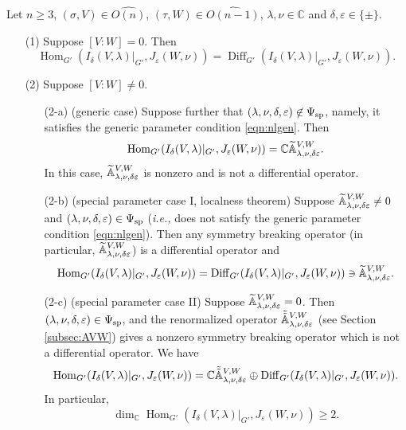 \begin{theorem}
\label{thm:VWSBO}
Let $n \ge 3$, 
 $(\sigma, V) \in \widehat{O(n)}$, 
 $(\tau,W) \in \widehat{O(n-1)}$, 
 $\lambda, \nu \in {\mathbb{C}}$
 and $\delta, \varepsilon \in \{\pm\}$.  
\begin{enumerate}
\item[{\rm{(1)}}]
Suppose 
$[V:W] =0$.  
Then 
\[
  {\operatorname{Hom}}_{G'}(I_{\delta}(V,\lambda)|_{G'}, J_{\varepsilon}(W,\nu))  =
{\operatorname{Diff}}_{G'}(I_{\delta}(V,\lambda)|_{G'}, J_{\varepsilon}(W,\nu)).  
\]
\item[{\rm{(2)}}]
Suppose $[V:W]  \ne 0$.  
\begin{enumerate}
\item[{\rm{(2-a)}}]
{\rm{(generic case)}}\enspace
Suppose further 
 that $(\lambda, \nu, \delta, \varepsilon) \not\in \Psi_{{\operatorname{sp}}}$, 
 namely,
 it satisfies
 the generic parameter condition \eqref{eqn:nlgen}.  
Then 
\[
  {\operatorname{Hom}}_{G'}(I_{\delta}(V,\lambda)|_{G'}, J_{\varepsilon}(W,\nu))  =
{\mathbb{C}} {\widetilde{\mathbb{A}}}_{{\lambda},{\nu},{\delta\varepsilon}}^{{V,W}}.  
\]
In this case, 
 ${\widetilde{\mathbb{A}}}_{{\lambda},{\nu},{\delta\varepsilon}}^{{V,W}}$ is nonzero 
 and is not a differential operator.  
\item[{\rm{(2-b)}}]
{\rm{(special parameter case I, localness theorem)}}\enspace
{}
Suppose ${\widetilde{\mathbb{A}}}_{{\lambda},{\nu},{\delta\varepsilon}}^{{V,W}} \ne 0$
 and $(\lambda, \nu, \delta, \varepsilon)\in \Psi_{{\operatorname{sp}}}$
 ({\it{i.e.,}} does not satisfy the generic parameter condition \eqref{eqn:nlgen}).  
Then any symmetry breaking operator
 (in particular, 
 ${\widetilde{\mathbb{A}}}_{{\lambda},{\nu},{\delta\varepsilon}}^{{V,W}}$) is a differential operator and 
\[
  {\operatorname{Hom}}_{G'}(I_{\delta}(V,\lambda)|_{G'}, J_{\varepsilon}(W,\nu))  =
   {\operatorname{Diff}}_{G'}(I_{\delta}(V,\lambda)|_{G'}, J_{\varepsilon}(W,\nu))
\ni
{\widetilde{\mathbb{A}}}_{{\lambda},{\nu},{\delta\varepsilon}}^{{V,W}}.  
\]
\item[{\rm{(2-c)}}]
{\rm{(special parameter case II)}}\enspace
Suppose ${\widetilde{\mathbb{A}}}_{{\lambda},{\nu},{\delta\varepsilon}}^{{V,W}} = 0$.  
Then $(\lambda, \nu, \delta, \varepsilon)\in \Psi_{{\operatorname{sp}}}$, 
 and the 
renormalized operator 
$\tilde{\tilde{{\mathbb{A}}}}_{{\lambda},{\nu},{\delta\varepsilon}}^{{V,W}}$
 (see Section \ref{subsec:AVW})
 gives a nonzero symmetry breaking operator
 which is not a differential operator.
We have
\[
  {\operatorname{Hom}}_{G'}(I_{\delta}(V,\lambda)|_{G'}, J_{\varepsilon}(W,\nu))  =
  {\mathbb{C}} \tilde{\tilde{{\mathbb{A}}}}_{{\lambda},{\nu},{\delta\varepsilon}}^{{V,W}}
  \oplus
  {\operatorname{Diff}}_{G'}(I_{\delta}(V,\lambda)|_{G'}, 
 J_{\varepsilon}(W,\nu)).  
\]
In particular, 
\[
  \dim_{\mathbb{C}}
  {\operatorname{Hom}}_{G'}(I_{\delta}(V,\lambda)|_{G'}, J_{\varepsilon}(W,\nu))  \ge 2.  
\]
\end{enumerate}
\end{enumerate}
\end{theorem}




